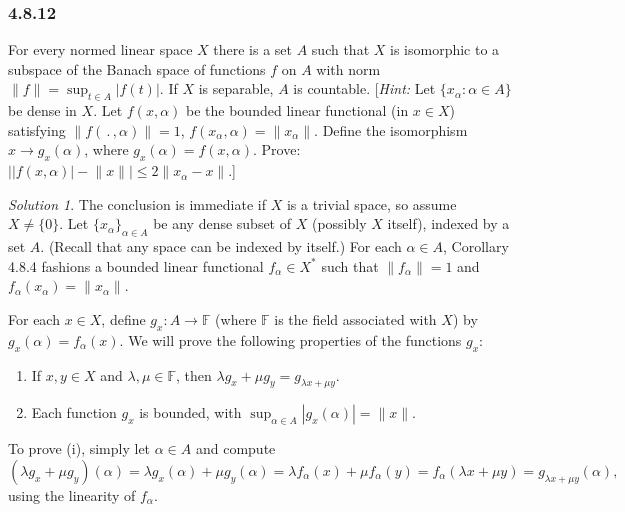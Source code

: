 \documentclass{report}
\newcommand{\bb}[1]{\mathbb{#1}}
\newcommand{\norm}[1]{{\lVert #1 \rVert}}
\theoremstyle{remark}
\newtheorem*{solution}{Solution}
\begin{document}
\subsubsection*{4.8.12}
For every normed linear space $X$ there is a set $A$ such that $X$ is isomorphic to a subspace of the Banach space of functions $f$ on $A$ with norm $\norm f = \sup_{t \in A} |f(t)|$. If $X$ is separable, $A$ is countable. [\emph{Hint:} Let $\{x_\alpha: \alpha \in A\}$ be dense in $X$. Let $f(x,\alpha)$ be the bounded linear functional (in $x \in X$) satisfying $\norm{f(\, . \,,\alpha)} = 1$, $f(x_\alpha, \alpha) = \norm{x_\alpha}$. Define the isomorphism $x \to g_x(\alpha)$, where $g_x(\alpha) = f(x, \alpha)$. Prove: $\big| |f(x,\alpha)| - \norm x \big| \le 2 \norm{x_\alpha - x}$.]

\begin{solution}
  The conclusion is immediate if $X$ is a trivial space, so assume $X \ne \{0\}$. Let $\{x_\alpha\}_{\alpha \in A}$ be any dense subset of $X$ (possibly $X$ itself), indexed by a set $A$. (Recall that any space can be indexed by itself.) For each $\alpha \in A$, Corollary 4.8.4 fashions a bounded linear functional $f_\alpha \in X^*$ such that $\norm{f_\alpha} = 1$ and $f_\alpha(x_\alpha) = \norm{x_\alpha}$.

  For each $x \in X$, define $g_x: A \to \bb F$ (where $\bb F$ is the field associated with $X$) by $g_x(\alpha) = f_\alpha(x)$. We will prove the following properties of the functions $g_x$:
  \begin{enumerate}[label=(\roman*)]
    \item If $x, y \in X$ and $\lambda, \mu \in \bb F$, then $\lambda g_x + \mu g_y = g_{\lambda x + \mu y}$.
    \item Each function $g_x$ is bounded, with $\sup_{\alpha \in A} |g_x(\alpha)| = \norm x$.
  \end{enumerate}

  To prove (i), simply let $\alpha \in A$ and compute
  \begin{equation*}
    (\lambda g_x + \mu g_y)(\alpha) = \lambda g_x(\alpha) + \mu g_y(\alpha) = \lambda f_\alpha(x) + \mu f_\alpha(y) = f_\alpha(\lambda x + \mu y) = g_{\lambda x + \mu y}(\alpha),
  \end{equation*}
  using the linearity of $f_\alpha$.


\end{solution}
\end{document}

